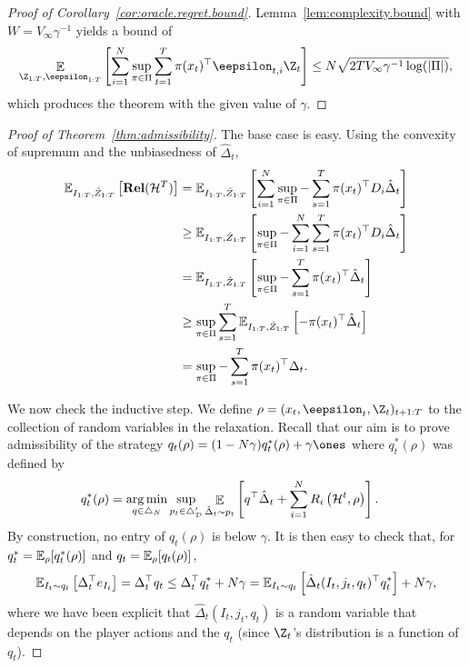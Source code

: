\documentclass{article}
\newcommand{\exop}{\mathop{\ex}}
\newcommand{\rel}{\mathbf{Rel}}
\newcommand{\hist}{{\mathcal H}}
\begin{document}
\begin{proof}[Proof of Corollary~\ref{cor:oracle.regret.bound}]
  Lemma~\ref{lem:complexity.bound} with $W = V_\infty \gamma^{-1}$ yields a bound of
  \[
    \exop_{\Z_{1:T},\eepsilon_{1:T}}\left[\sum_{i=1}^N\sup_{\pi\in\Pi} \sum_{t=1}^T \pi(x_t)^\top \eepsilon_{t,i} \Z_t \right] \leq N \sqrt{2 T V_\infty \gamma^{-1} \log(\vert \Pi\vert)},
  \]
  which produces the theorem with the given value of $\gamma$.
\end{proof}


\begin{proof}[Proof of Theorem~\ref{thm:admissibility}]
  The base case is easy. Using the convexity of supremum and the unbiasedness of $\hat\Delta_t$,
  \begin{align*}
  \ex_{I_{1:T},\hat Z_{1:T}}\left[
  \rel(\hist^T)
  \right]
  &=
    \ex_{I_{1:T},\hat Z_{1:T}}\left[
    \sum_{i=1}^N\sup_{\pi\in\Pi}
    -\sum_{s=1}^T \pi(x_t)^\top D_i \hat \Delta_t
    \right]\\
  &\geq
    \ex_{I_{1:T},\hat Z_{1:T}}\left[
    \sup_{\pi\in\Pi}
    -\sum_{i=1}^N \sum_{s=1}^T \pi(x_t)^\top D_i \hat \Delta_t
    \right]\\
  &=
    \ex_{I_{1:T},\hat Z_{1:T}}\left[    
    \sup_{\pi\in\Pi}
    -\sum_{s=1}^T \pi(x_t)^\top \hat \Delta_t
    \right]\\
  &\geq
    \sup_{\pi\in\Pi}
    \sum_{s=1}^T
    \ex_{I_{1:T},\hat Z_{1:T}}\left[
    - \pi(x_t)^\top \hat \Delta_t
    \right]\\
  &=
    \sup_{\pi\in\Pi}
    -\sum_{s=1}^T \pi(x_t)^\top \Delta_t.
  \end{align*}

  We now check the inductive step. We define $\rho = (x_t,\eepsilon_t,\Z_t)_{t+1:T}$ to the collection of random variables in the relaxation. Recall that our aim is to prove admissibility of the strategy $q_t(\rho) = (1-N\gamma)q_t^*(\rho)+ \gamma \ones$ where $q_t^*(\rho)$ was defined by
  \begin{align*}
  q_t^*(\rho)
  &=
  \argmin_{q \in \triangle_{N}}
  \sup_{p_t \in \triangle_{\mathcal D}'} 
    \exop_{\hat\Delta_t \sim p_t}\left[
    q^\top\hat\Delta_t
    +  \sum_{i=1}^N R_i\left(\hist^{t},\rho\right)
    \right].
\end{align*}
By construction, no entry of $q_t(\rho)$ is below $\gamma$. It is then easy to check that, for $q_t^* = \mathbb E_{\rho}[q_t^*(\rho)]$ and $q_t = \mathbb E_{\rho}[q_t(\rho)]$,
\[
  \mathbb E_{I_t \sim q_t}\left[ \Delta_t ^\top e_{I_t} \right] = \Delta_t^\top q_t  
  \leq \Delta_t^\top q_t^* + N\gamma
  =
  \mathbb E_{I_t\sim q_t} \left[ \hat\Delta_t(I_t,j_t,q_t)^\top q_t^* \right] + N\gamma,
\]
where we have been explicit that $\hat\Delta_t(I_t,j_t,q_t)$ is a random variable that depends on the player actions and the $q_t$ (since $\Z_t$'s distribution is a function of $q_t$). 


\end{proof}
\end{document}

